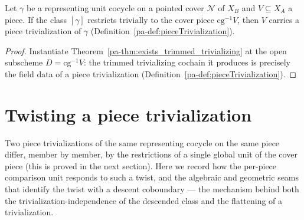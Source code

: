 \begin{theorem}
  \label{pa-thm:pieceTrivialization_of_triv}
  \leanok

  Let \(\gamma\) be a representing unit cocycle on a pointed cover \(\mathcal N\) of \(X_B\) and \(V
  \subseteq X_A\) a piece. If the class \([\gamma]\) restricts trivially to the cover piece
  \(\mathrm{cg}^{-1}V\), then \(V\) carries a piece trivialization of \(\gamma\)
  (Definition~\ref{pa-def:pieceTrivialization}).
\end{theorem}
\begin{proof}
  \leanok
  Instantiate Theorem~\ref{pa-thm:exists_trimmed_trivializing} at the open subscheme \(D = \mathrm{cg}
  ^{-1}V\): the trimmed trivializing cochain it produces is precisely the field data of a piece
  trivialization (Definition~\ref{pa-def:pieceTrivialization}).
\end{proof}

\section{Twisting a piece trivialization}
\label{pa-sec:effectivityTwist}

Two piece trivializations of the same representing cocycle on the same piece differ, member by member,
by the restrictions of a single global unit of the cover piece (this is proved in the next section).
Here we record how the per-piece comparison unit responds to such a twist, and the algebraic and
geometric seams that identify the twist with a descent coboundary --- the mechanism behind both the
trivialization-independence of the descended class and the flattening of a trivialization.

